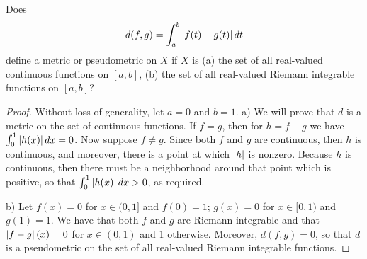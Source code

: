 \begin{exercise}{14}
Does 
\[
d(f,g)=\int^b_a\left\lvert f(t)-g(t)\right\rvert dt
\]
define a metric or pseudometric on $X$ if $X$ is (a) the set of all real-valued continuous functions on $[a,b]$, (b) the set of all real-valued Riemann integrable functions on $[a,b]$?
\end{exercise}
\begin{proof}
Without loss of generality, let $a=0$ and $b=1$.
a) We will prove that $d$ is a metric on the set of continuous functions. If $f=g$, then for $h=f-g$ we have $\int^1_0\left\lvert h(x)\right\rvert dx=0$. Now suppose $f\neq g$. Since both $f$ and $g$ are continuous, then $h$ is continuous, and moreover, there is a point at which $\left\lvert h\right\rvert$ is nonzero. Because $h$ is continuous, then there must be a neighborhood around that point which is positive, so that $\int^1_0\left\lvert h(x)\right\rvert dx> 0$, as required.

b) Let $f(x)=0$ for $x\in(0,1]$ and $f(0)=1$; $g(x)=0$ for $x\in[0,1)$ and $g(1)=1$. We have that both $f$ and $g$ are Riemann integrable and that $\left\lvert f-g\right\rvert(x)=0$ for $x\in(0,1)$ and 1 otherwise. Moreover, $d(f,g)=0$, so that $d$ is a pseudometric on the set of all real-valued Riemann integrable functions.
\end{proof}
